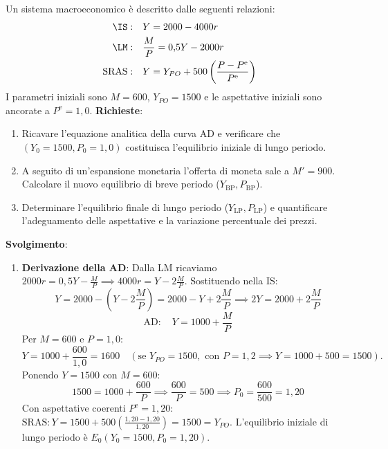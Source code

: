\begin{esercizio}
Un sistema macroeconomico è descritto dalle seguenti relazioni:
\begin{align*}
    \IS: &\quad Y = 2000 - 4000 r \\
    \LM: &\quad \frac{M}{P} = 0{,}5 Y - 2000 r \\
    \mathrm{SRAS}: &\quad Y = Y_{PO} + 500 \left( \frac{P - P^{\mathrm{e}}}{P^{\mathrm{e}}} \right)
\end{align*}
I parametri iniziali sono $M = 600$, $Y_{PO} = 1500$ e le aspettative iniziali sono ancorate a $P^{\mathrm{e}} = 1{,}0$.
\textbf{Richieste}:
\begin{enumerate}
    \item Ricavare l'equazione analitica della curva AD e verificare che $(Y_0 = 1500, P_0 = 1{,}0)$ costituisca l'equilibrio iniziale di lungo periodo.
    \item A seguito di un'espansione monetaria l'offerta di moneta sale a $M' = 900$. Calcolare il nuovo equilibrio di breve periodo ($Y_{\text{BP}}, P_{\text{BP}}$).
    \item Determinare l'equilibrio finale di lungo periodo ($Y_{\text{LP}}, P_{\text{LP}}$) e quantificare l'adeguamento delle aspettative e la variazione percentuale dei prezzi.
\end{enumerate}

\textbf{Svolgimento}:
\begin{enumerate}
    \item \textbf{Derivazione della AD}:
    Dalla LM ricaviamo $2000 r = 0{,}5 Y - \frac{M}{P} \implies 4000 r = Y - 2\frac{M}{P}$.
    Sostituendo nella IS:
    \begin{equation*}
        Y = 2000 - \left( Y - 2\frac{M}{P} \right) = 2000 - Y + 2\frac{M}{P} \implies 2Y = 2000 + 2\frac{M}{P}
    \end{equation*}
    \begin{equation*}
        \mathrm{AD}: \quad Y = 1000 + \frac{M}{P}
    \end{equation*}
    Per $M = 600$ e $P = 1{,}0$:
    \begin{equation*}
        Y = 1000 + \frac{600}{1{,}0} = 1600 \quad (\text{se } Y_{PO} = 1500, \text{ con } P=1{,}2 \implies Y = 1000 + 500 = 1500).
    \end{equation*}
    Ponendo $Y = 1500$ con $M = 600$:
    \begin{equation*}
        1500 = 1000 + \frac{600}{P} \implies \frac{600}{P} = 500 \implies P_0 = \frac{600}{500} = 1{,}20
    \end{equation*}
    Con aspettative coerenti $P^{\mathrm{e}} = 1{,}20$: $\mathrm{SRAS}: Y = 1500 + 500 \left( \frac{1{,}20 - 1{,}20}{1{,}20} \right) = 1500 = Y_{PO}$.
    L'equilibrio iniziale di lungo periodo è $E_0(Y_0 = 1500, P_0 = 1{,}20)$.


\end{enumerate}
\end{esercizio}
